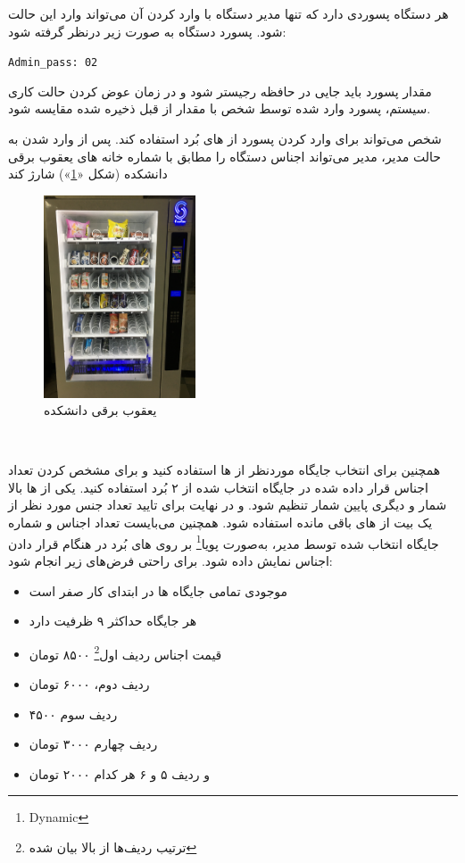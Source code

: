 \documentclass[]{article}
\begin{document}
هر دستگاه پسوردی دارد که تنها مدیر دستگاه با وارد کردن آن می‌تواند وارد این حالت شود. پسورد دستگاه به صورت زیر درنظر گرفته شود:

\begin{latin}
	\texttt{Admin\_pass: 02}
\end{latin}



مقدار پسورد باید جایی در حافظه رجیستر شود و در زمان عوض کردن حالت کاری سیستم، پسورد وارد شده توسط شخص با مقدار از قبل ذخیره شده مقایسه شود.

شخص می‌تواند برای وارد کردن پسورد از  های بُرد استفاده کند. پس از وارد شدن به حالت مدیر، مدیر می‌تواند اجناس دستگاه را مطابق با شماره خانه های یعقوب برقی دانشکده (شکل «\textcolor{blue}{\ref{یعقوب برقی دانشکده}}») شارژ کند



\begin{figure}[h]
	\centering
	\includegraphics[width=0.4\textwidth]{images/img2.jpg}
	\caption{یعقوب برقی دانشکده}
	\label{یعقوب برقی دانشکده}
\end{figure}

\newpage
\Large \textbf{\\
}

همچنین برای انتخاب جایگاه موردنظر از  ها استفاده کنید و برای مشخص کردن تعداد اجناس قرار داده شده در جایگاه انتخاب شده از ۲  بُرد استفاده کنید. یکی از  ها بالا شمار و دیگری پایین شمار تنظیم شود. و در نهایت برای تایید تعداد جنس مورد نظر از یک بیت از  های باقی مانده استفاده شود. همچنین می‌بایست تعداد اجناس و شماره جایگاه انتخاب شده توسط مدیر، به‌صورت پویا\footnote{Dynamic} بر روی  های بُرد در هنگام قرار دادن اجناس نمایش داده شود. برای راحتی فرض‌های زیر انجام شود:

\begin{itemize}
	\item موجودی تمامی جایگاه ها در ابتدای کار صفر است
	\item هر جایگاه حداکثر ۹ ظرفیت دارد
	\item قیمت اجناس ردیف اول\footnote{ترتیب ردیف‌ها از بالا بیان شده} ۸۵۰۰ تومان
	\item ردیف دوم، ۶۰۰۰ تومان
	\item ردیف سوم ۴۵۰۰
	\item ردیف چهارم ۳۰۰۰ تومان
	\item و ردیف ۵ و ۶ هر کدام ۲۰۰۰ تومان
\end{itemize}
\end{document}
